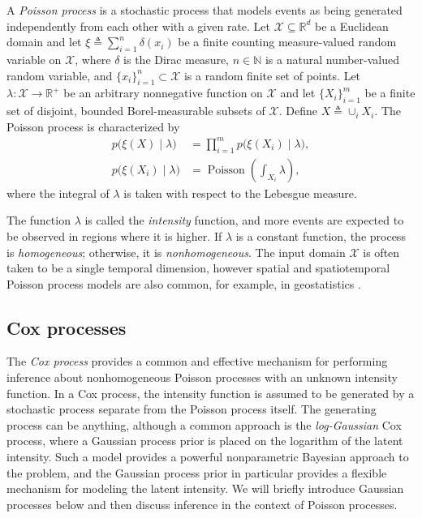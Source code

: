 \documentclass{article}
\newcommand{\deq}{\triangleq}
\newcommand{\cm}[1]{\mathcal{#1}}
\newcommand{\given}{\mid}
\newcommand{\R}{\mathbb{R}}
\newcommand{\N}{\mathbb{N}}
\DeclareMathOperator{\poisson}{Poisson}
\begin{document}
A \emph{Poisson process} is a stochastic process that models events as
being generated independently from each other with a given rate.  Let
$\cm{X} \subseteq \R^d$ be a Euclidean domain and let $\xi \deq
\sum_{i = 1}^n \delta(x_i)$ be a finite counting measure-valued random
variable on $\cm{X}$, where $\delta$ is the Dirac measure, $n \in \N$
is a natural number-valued random variable, and $\lbrace x_i
\rbrace_{i = 1}^n \subset \cm{X}$ is a random finite set of points.
Let $\lambda\colon \cm{X} \to \R^+$ be an arbitrary nonnegative
function on $\cm{X}$ and let $\lbrace X_i \rbrace_{i = 1}^m$ be a
finite set of disjoint, bounded Borel-measurable subsets of $\cm{X}$.
Define $X \deq \cup_i X_i$.  The Poisson process is characterized by
\begin{align}
  p\bigl(\xi(X) \given \lambda \bigr) 
  &= 
  \prod_{i=1}^m p\bigl(\xi(X_i)\given \lambda \bigr),
  \nonumber
  \\
  p\bigl(\xi(X_i) \given \lambda \bigr)
  &=
  \poisson\left( \textstyle \int_{X_i} \lambda \right),
  \label{realprobability}
\end{align}
where the integral of $\lambda$ is taken with respect to the Lebesgue
measure.

The function $\lambda$ is called the \emph{intensity} function, and
more events are expected to be observed in regions where it is higher.
If $\lambda$ is a constant function, the process is
\emph{homogeneous}; otherwise, it is \emph{nonhomogeneous}.  The input
domain $\cm{X}$ is often taken to be a single temporal dimension,
however spatial and spatiotemporal Poisson process models are also
common, for example, in geostatistics \citep{diggle}.

\subsection{Cox processes}

The \emph{Cox process} provides a common and effective mechanism for
performing inference about nonhomogeneous Poisson processes with an
unknown intensity function.  In a Cox process, the intensity function
is assumed to be generated by a stochastic process separate from the
Poisson process itself.  The generating process can be anything,
although a common approach is the \emph{log-Gaussian} Cox process,
where a Gaussian process prior is placed on the logarithm of the
latent intensity.  Such a model provides a powerful nonparametric
Bayesian approach to the problem, and the Gaussian process prior in
particular provides a flexible mechanism for modeling the latent
intensity.  We will briefly introduce Gaussian processes below and
then discuss inference in the context of Poisson processes.
\end{document}
